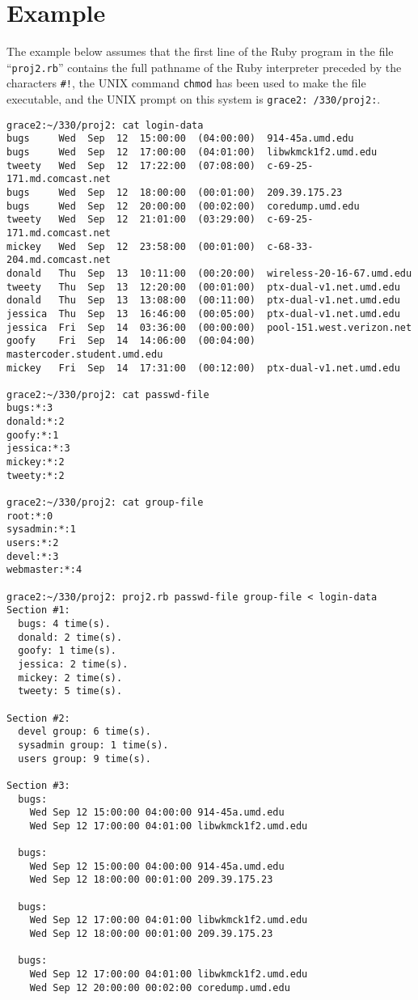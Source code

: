 \documentclass[11pt]{article}
\begin{document}
        \vspace{-3.5mm}

        \enlargethispage{3mm}

  \section{Example}

    The example below assumes that the first line of the Ruby program in the
  file ``\texttt{proj2.rb}'' contains the full pathname of the Ruby
  interpreter preceded by the characters \texttt{\#!}, the UNIX command
  \texttt{chmod} has been used to make the file executable, and the UNIX
  prompt on this system is \texttt{grace2:\string~/330/proj2:}.

    \begin{Verbatim}[gobble=0,formatcom=\small,baselinestretch=.9,
                     commandchars=\\\{\}]
grace2:~/330/proj2: cat login-data
bugs     Wed  Sep  12  15:00:00  (04:00:00)  914-45a.umd.edu
bugs     Wed  Sep  12  17:00:00  (04:01:00)  libwkmck1f2.umd.edu
tweety   Wed  Sep  12  17:22:00  (07:08:00)  c-69-25-171.md.comcast.net
bugs     Wed  Sep  12  18:00:00  (00:01:00)  209.39.175.23
bugs     Wed  Sep  12  20:00:00  (00:02:00)  coredump.umd.edu
tweety   Wed  Sep  12  21:01:00  (03:29:00)  c-69-25-171.md.comcast.net
mickey   Wed  Sep  12  23:58:00  (00:01:00)  c-68-33-204.md.comcast.net
donald   Thu  Sep  13  10:11:00  (00:20:00)  wireless-20-16-67.umd.edu
tweety   Thu  Sep  13  12:20:00  (00:01:00)  ptx-dual-v1.net.umd.edu
donald   Thu  Sep  13  13:08:00  (00:11:00)  ptx-dual-v1.net.umd.edu
jessica  Thu  Sep  13  16:46:00  (00:05:00)  ptx-dual-v1.net.umd.edu
jessica  Fri  Sep  14  03:36:00  (00:00:00)  pool-151.west.verizon.net
goofy    Fri  Sep  14  14:06:00  (00:04:00)  mastercoder.student.umd.edu
mickey   Fri  Sep  14  17:31:00  (00:12:00)  ptx-dual-v1.net.umd.edu

grace2:~/330/proj2: cat passwd-file
bugs:*:3
donald:*:2
goofy:*:1
jessica:*:3
mickey:*:2
tweety:*:2

grace2:~/330/proj2: cat group-file
root:*:0
sysadmin:*:1
users:*:2
devel:*:3
webmaster:*:4

grace2:~/330/proj2: proj2.rb passwd-file group-file < login-data
Section #1:
  bugs: 4 time(s).
  donald: 2 time(s).
  goofy: 1 time(s).
  jessica: 2 time(s).
  mickey: 2 time(s).
  tweety: 5 time(s).

Section #2:
  devel group: 6 time(s).
  sysadmin group: 1 time(s).
  users group: 9 time(s).

Section #3:
  bugs:
    Wed Sep 12 15:00:00 04:00:00 914-45a.umd.edu
    Wed Sep 12 17:00:00 04:01:00 libwkmck1f2.umd.edu

  bugs:
    Wed Sep 12 15:00:00 04:00:00 914-45a.umd.edu
    Wed Sep 12 18:00:00 00:01:00 209.39.175.23

  bugs:
    Wed Sep 12 17:00:00 04:01:00 libwkmck1f2.umd.edu
    Wed Sep 12 18:00:00 00:01:00 209.39.175.23

  bugs:
    Wed Sep 12 17:00:00 04:01:00 libwkmck1f2.umd.edu
    Wed Sep 12 20:00:00 00:02:00 coredump.umd.edu
    \end{Verbatim}
\end{document}
